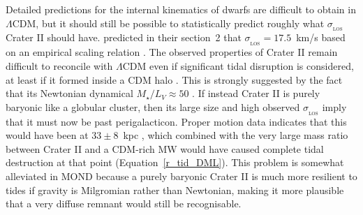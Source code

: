 \documentclass[fleqn,usenatbib,useAMS,onecolumn]{mnras} %
\begin{document}
Detailed predictions for the internal kinematics of dwarfs are difficult to obtain in $\Lambda$CDM, but it should still be possible to statistically predict roughly what $\sigma_{_\text{LOS}}$ Crater II should have. \citet{McGaugh_2016_CraterII} predicted in their section~2 that $\sigma_{_\text{LOS}} = 17.5$~km/s based on an empirical scaling relation \citep{Walker_2010}. The observed properties of Crater II remain difficult to reconcile with $\Lambda$CDM even if significant tidal disruption is considered, at least if it formed inside a CDM halo \citep{Borukhovetskaya_2022, Errani_2022}. This is strongly suggested by the fact that its Newtonian dynamical $M_{\star}/L_V \approx 50$ \citep{Caldwell_2017, Fu_2019}. If instead Crater II is purely baryonic like a globular cluster, then its large size and high observed $\sigma_{_\text{LOS}}$ imply that it must now be past perigalacticon. Proper motion data indicates that this would have been at $33 \pm 8$~kpc \citep[table~4 of][]{Hefan_Li_2021}, which combined with the very large mass ratio between Crater II and a CDM-rich MW would have caused complete tidal destruction at that point (Equation~\ref{r_tid_DML}). This problem is somewhat alleviated in MOND because a purely baryonic Crater II is much more resilient to tides if gravity is Milgromian rather than Newtonian, making it more plausible that a very diffuse remnant would still be recognisable.


\end{document}
